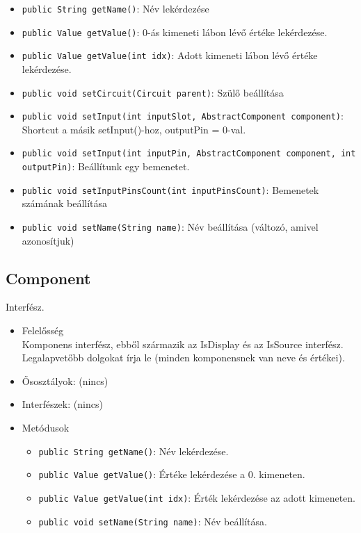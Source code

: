 \begin{itemize}
\begin{itemize}
	\item \texttt{public String getName()}: Név lekérdezése
	\item \texttt{public Value getValue()}: 0-ás kimeneti lábon lévő értéke lekérdezése.
	\item \texttt{public Value getValue(int idx)}: Adott kimeneti lábon lévő értéke lekérdezése.
	\item \texttt{public void setCircuit(Circuit parent)}: Szülő beállítása
	\item \texttt{public void setInput(int inputSlot, AbstractComponent component)}: Shortcut a másik setInput()-hoz, outputPin = 0-val.
	\item \texttt{public void setInput(int inputPin, AbstractComponent component, int outputPin)}: Beállítunk egy bemenetet.
	\item \texttt{public void setInputPinsCount(int inputPinsCount)}: Bemenetek számának beállítása
	\item \texttt{public void setName(String name)}: Név beállítása (változó, amivel azonosítjuk)
\end{itemize}
\end{itemize}

\subsection{Component}
Interfész.
\begin{itemize}
\item Felelősség\\
Komponens interfész, ebből származik az IsDisplay és az IsSource interfész.  Legalapvetőbb dolgokat írja le (minden komponensnek van neve és értékei).
\item Ősosztályok: (nincs)
\item Interfészek: (nincs)
\item Metódusok$\ $
\begin{itemize}
	\item \texttt{public String getName()}: Név lekérdezése.
	\item \texttt{public Value getValue()}: Értéke lekérdezése a 0. kimeneten.
	\item \texttt{public Value getValue(int idx)}: Érték lekérdezése az adott kimeneten.
	\item \texttt{public void setName(String name)}: Név beállítása.
\end{itemize}
\end{itemize}

